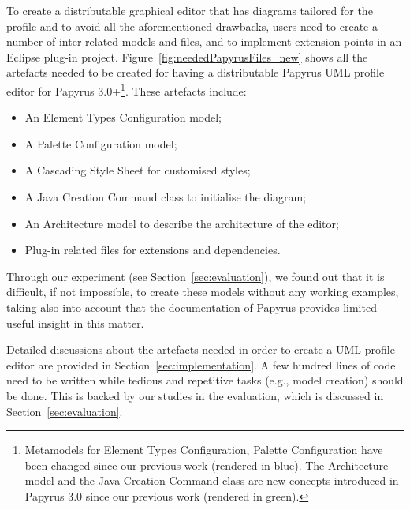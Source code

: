 To create a distributable graphical editor that has diagrams tailored for the profile and to avoid all the aforementioned drawbacks, users need to create a number of inter-related models and files, and to implement extension points in an Eclipse plug-in project. 
Figure~\ref{fig:neededPapyrusFiles_new} shows all the artefacts needed to be created for having a distributable Papyrus UML profile editor for Papyrus 3.0+\footnote{Metamodels for Element Types Configuration, Palette Configuration have been changed since our previous work (rendered in blue).	The Architecture model and the Java Creation Command class are new concepts introduced in Papyrus 3.0 since our previous work (rendered in green).}.
These artefacts include:
\begin{itemize}
	\item An Element Types Configuration model;
	\item A Palette Configuration model;
	\item A Cascading Style Sheet for customised styles;
	\item A Java Creation Command class to initialise the diagram;
	\item An Architecture model to describe the architecture of the editor;
	\item Plug-in related files for extensions and dependencies.
\end{itemize}


Through our experiment (see Section~\ref{sec:evaluation}), we found out that it is difficult, if not impossible, to create these models without any working examples, taking also into account that the documentation of Papyrus provides limited useful insight in this matter.

Detailed discussions about the artefacts needed in order to create a UML profile editor are provided in Section~\ref{sec:implementation}.
A few hundred lines of code need to be written while tedious and repetitive tasks (e.g., model creation) should be done. 
This is backed by our studies in the evaluation, which is discussed in Section~\ref{sec:evaluation}.

